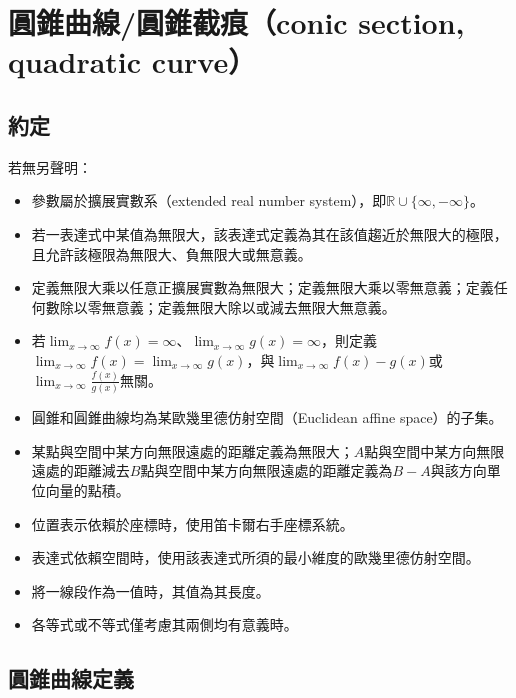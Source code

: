 \documentclass[a4paper,12pt]{report}
\begin{document}
\section{圓錐曲線/圓錐截痕（conic section, quadratic curve）}
\subsection{約定}
若無另聲明：
\begin{itemize}
\item 參數屬於擴展實數系（extended real number system），即$\mathbb{R}\cup\{\infty,-\infty\}$。
\item 若一表達式中某值為無限大，該表達式定義為其在該值趨近於無限大的極限，且允許該極限為無限大、負無限大或無意義。
\item 定義無限大乘以任意正擴展實數為無限大；定義無限大乘以零無意義；定義任何數除以零無意義；定義無限大除以或減去無限大無意義。
\item 若$\lim_{x\to\infty}f(x)=\infty$、$\lim_{x\to\infty}g(x)=\infty$，則定義$\lim_{x\to\infty}f(x)=\lim_{x\to\infty}g(x)$，與$\lim_{x\to\infty}f(x)-g(x)$或$\lim_{x\to\infty}\frac{f(x)}{g(x)}$無關。
\item 圓錐和圓錐曲線均為某歐幾里德仿射空間（Euclidean affine space）的子集。
\item 某點與空間中某方向無限遠處的距離定義為無限大；$A$點與空間中某方向無限遠處的距離減去$B$點與空間中某方向無限遠處的距離定義為$B-A$與該方向單位向量的點積。
\item 位置表示依賴於座標時，使用笛卡爾右手座標系統。
\item 表達式依賴空間時，使用該表達式所須的最小維度的歐幾里德仿射空間。
\item 將一線段作為一值時，其值為其長度。
\item 各等式或不等式僅考慮其兩側均有意義時。
\end{itemize}
\subsection{圓錐曲線定義}
\end{document}
